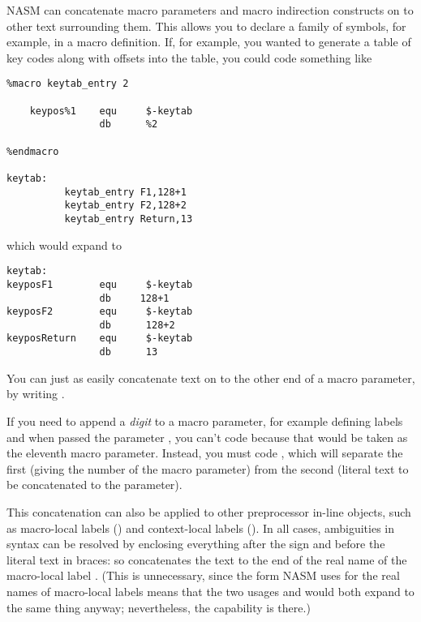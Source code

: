 NASM can concatenate macro parameters and macro indirection constructs
on to other text surrounding them. This allows you to declare a family
of symbols, for example, in a macro definition. If, for example, you
wanted to generate a table of key codes along with offsets into the
table, you could code something like

\begin{lstlisting}
%macro keytab_entry 2

    keypos%1    equ     $-keytab
                db      %2

%endmacro

keytab:
          keytab_entry F1,128+1
          keytab_entry F2,128+2
          keytab_entry Return,13
\end{lstlisting}

which would expand to

\begin{lstlisting}
keytab:
keyposF1        equ     $-keytab
                db     128+1
keyposF2        equ     $-keytab
                db      128+2
keyposReturn    equ     $-keytab
                db      13
\end{lstlisting}

You can just as easily concatenate text on to the other end of a
macro parameter, by writing .

If you need to append a \emph{digit} to a macro parameter, for example
defining labels  and  when passed the parameter
, you can't code  because that would be taken as the
eleventh macro parameter. Instead, you must code
, which will separate the first
 (giving the number of the macro parameter) from the second
(literal text to be concatenated to the parameter).

This concatenation can also be applied to other preprocessor in-line
objects, such as macro-local labels ()
and context-local labels ().
In all cases, ambiguities in syntax can be resolved by enclosing
everything after the \code{\%} sign and before the literal text
in braces: so  concatenates the text 
to the end of the real name of the macro-local label .
(This is unnecessary, since the form NASM uses for the real names of
macro-local labels means that the two usages 
and  would both expand to the same
thing anyway; nevertheless, the capability is there.)

